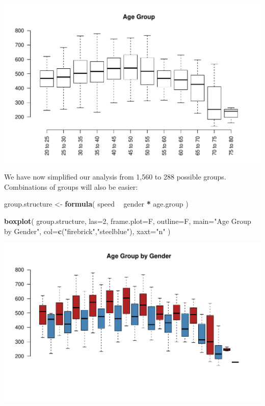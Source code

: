 \documentclass[]{book}
\newenvironment{Shaded}{\begin{snugshade}}{\end{snugshade}}
\newcommand{\DataTypeTok}[1]{\textcolor[rgb]{0.13,0.29,0.53}{#1}}
\newcommand{\DecValTok}[1]{\textcolor[rgb]{0.00,0.00,0.81}{#1}}
\newcommand{\KeywordTok}[1]{\textcolor[rgb]{0.13,0.29,0.53}{\textbf{#1}}}
\newcommand{\NormalTok}[1]{#1}
\newcommand{\OperatorTok}[1]{\textcolor[rgb]{0.81,0.36,0.00}{\textbf{#1}}}
\newcommand{\StringTok}[1]{\textcolor[rgb]{0.31,0.60,0.02}{#1}}
\theoremstyle{definition}
\theoremstyle{definition}
\theoremstyle{definition}
\theoremstyle{remark}
\begin{document}
\begin{center}\includegraphics[width=0.7\linewidth]{DS4PS-I_files/figure-latex/unnamed-chunk-153-1} \end{center}

We have now simplified our analysis from 1,560 to 288 possible groups.
Combinations of groups will also be easier:

\begin{Shaded}
\begin{Highlighting}[]

\NormalTok{group.structure <-}\StringTok{ }\KeywordTok{formula}\NormalTok{( speed }\OperatorTok{~}\StringTok{ }\NormalTok{gender }\OperatorTok{*}\StringTok{ }\NormalTok{age.group )}

\KeywordTok{boxplot}\NormalTok{( group.structure, }
         \DataTypeTok{las=}\DecValTok{2}\NormalTok{, }\DataTypeTok{frame.plot=}\NormalTok{F, }\DataTypeTok{outline=}\NormalTok{F, }\DataTypeTok{main=}\StringTok{"Age Group by Gender"}\NormalTok{,}
         \DataTypeTok{col=}\KeywordTok{c}\NormalTok{(}\StringTok{"firebrick"}\NormalTok{,}\StringTok{"steelblue"}\NormalTok{), }\DataTypeTok{xaxt=}\StringTok{"n"}\NormalTok{ )}
\end{Highlighting}
\end{Shaded}

\begin{center}\includegraphics[width=0.7\linewidth]{DS4PS-I_files/figure-latex/unnamed-chunk-154-1} \end{center}
\end{document}
